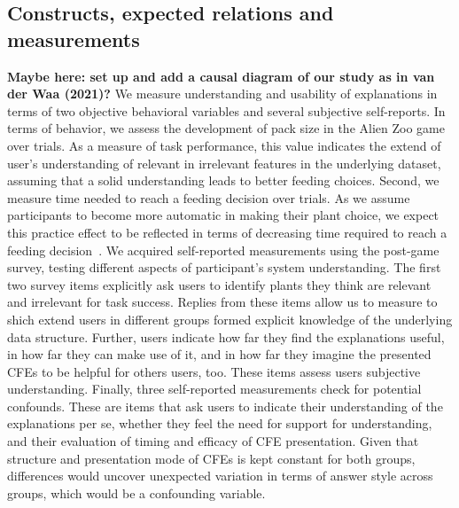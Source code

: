 {\subsection{Constructs, expected relations and measurements}

\textcolor{ACMDarkBlue}{
\textbf{Maybe here: set up and add a causal diagram of our study as in van der Waa (2021)?}
} \textcolor{ACMDarkBlue}{
We measure understanding and usability of explanations in terms of two objective behavioral variables and several subjective self-reports. 
} \textcolor{ACMDarkBlue}{
In terms of behavior, we assess the development of pack size in the Alien Zoo game over trials. 
As a measure of task performance, this value indicates the extend of user's understanding of relevant in irrelevant features in the underlying dataset, assuming that a solid understanding leads to better feeding choices. 
} \textcolor{ACMDarkBlue}{
Second, we measure time needed to reach a feeding decision over trials. As we assume participants to become more automatic in making their plant choice, we expect this practice effect to be reflected in terms of decreasing time required to reach a feeding decision~\citep{logan_shapes_1992}. 
} \textcolor{ACMDarkBlue}{
We acquired self-reported measurements using the post-game survey, testing different aspects of participant’s system understanding. 
} \textcolor{ACMDarkBlue}{
The first two survey items explicitly ask users to identify plants they think are relevant and irrelevant for task success. 
Replies from these items allow us to measure to shich extend users in different groups formed explicit knowledge of the underlying data structure. 
} \textcolor{ACMDarkBlue}{
Further, users indicate how far they find the explanations useful, in how far they can make use of it, and in how far they imagine the presented \glspl{CFE} to be helpful for others users, too. These items assess users subjective understanding.
} \textcolor{ACMDarkBlue}{
Finally, three self-reported measurements check for potential confounds. 
These are items that ask users to indicate their understanding of the explanations per se, whether they feel the need for support for understanding, and their evaluation of timing and efficacy of \gls{CFE} presentation.
Given that structure and presentation mode of \glspl{CFE} is kept constant for both groups, differences would uncover unexpected variation in terms of answer style across groups, which would be a confounding variable. 
}

}
